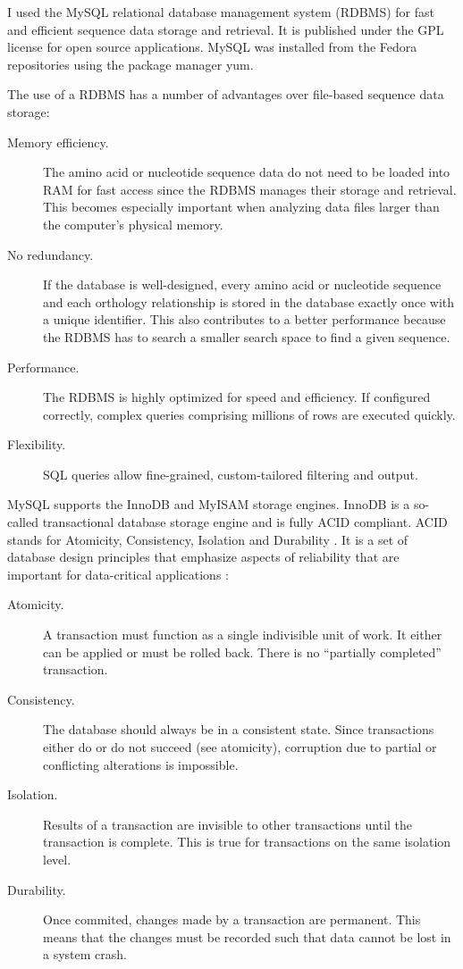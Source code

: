 \label{sec:mysql}
I used the MySQL relational database management system (RDBMS) for fast and
efficient sequence data storage and retrieval. It is published under the GPL
license for open source applications. MySQL was installed from the Fedora
repositories using the package manager yum.

The use of a RDBMS has a number of advantages over file-based sequence data
storage:

\begin{description}
	\item[Memory efficiency.] The amino acid or nucleotide sequence data do not
		need to be loaded into RAM for fast access since the RDBMS manages their
		storage and retrieval.  This becomes especially important when analyzing data
		files larger than the computer's physical memory.
	\item[No redundancy.] If the database is well-designed, every amino acid or
		nucleotide sequence and each orthology relationship is stored in the database
		exactly once with a unique identifier. This also contributes to a better
		performance because the RDBMS has to search a smaller search space to find a
		given sequence.
	\item[Performance.] The RDBMS is highly optimized for speed and efficiency. If
		configured correctly, complex queries comprising millions of rows are
		executed quickly.
	\item[Flexibility.] SQL queries allow fine-grained, custom-tailored filtering
		and output.
\end{description}

MySQL supports the InnoDB \citep{mysql2013} and MyISAM \citep{mysql2013} storage
engines. InnoDB is a so-called transactional database storage engine and is
fully ACID compliant. ACID stands for Atomicity, Consistency, Isolation and
Durability \citep{haerder1983}. It is a set of database design principles that
emphasize aspects of reliability that are important for data-critical
applications \citep{schwartz2012}:

\begin{description}
	\item[Atomicity.] A transaction must function as a single indivisible unit of
		work. It either can be applied or must be rolled back. There is no
		``partially completed'' transaction.
	\item[Consistency.] The database should always be in a consistent state. Since
		transactions either do or do not succeed (see atomicity), corruption due to
		partial or conflicting alterations is impossible.
	\item[Isolation.] Results of a transaction are invisible to other
		transactions until the transaction is complete. This is true for
		transactions on the same isolation level.
	\item[Durability.] Once commited, changes made by a transaction are permanent.
		This means that the changes must be recorded such that data cannot be lost
		in a system crash. 
\end{description}


